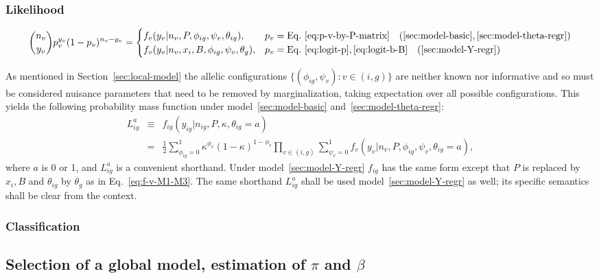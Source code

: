 \documentclass[letterpaper]{article}
\begin{document}
\subsubsection{Likelihood}

\begin{equation}
\label{eq:f-v-M1-M3}
\binom{n_v}{y_v} p_v^{y_v} (1-p_v)^{n_v-y_v}
=
\begin{cases}
f_v(y_v | n_v, P, \phi_{ig}, \psi_v, \theta_{ig}), & p_v =
\mathrm{Eq.~}\ref{eq:p-v-by-P-matrix}
\quad (\ref{sec:model-basic}, \ref{sec:model-theta-regr}) \\
f_v(y_v | n_v, x_i, B, \phi_{ig}, \psi_v, \theta_{g}), & p_v =
\mathrm{Eq.~}\ref{eq:logit-p},\ref{eq:logit-b-B}
\quad (\ref{sec:model-Y-regr})
\end{cases}
\end{equation}

As mentioned in Section~\ref{sec:local-model} the allelic configurations
\( \{ (\phi_{ig},\psi_v) : v\in(i,g) \} \) are
neither known nor informative and so must be considered nuisance parameters that
need to be removed by marginalization, taking expectation over all
possible configurations.  This yields the following probability mass
function under model~\ref{sec:model-basic} and~\ref{sec:model-theta-regr}:
\begin{eqnarray}
\label{eq:f-ig}
L_{ig}^a &\equiv&
f_{ig}(y_{ig} | n_{ig}, P, \kappa, \theta_{ig}=a)
\\
&=&
\frac{1}{2}
\sum_{\phi_{ig}=0}^1 \kappa^{\phi_v} (1 - \kappa)^{1-\phi_v}
\prod_{v\in(i,g)}
\sum_{\psi_v=0}^1
f_v(y_v | n_v, P, \phi_{ig}, \psi_v, \theta_{ig}=a),
\end{eqnarray}
where \(a\) is 0 or 1, and \(L_{ig}^a\) is a convenient shorthand.  Under
model~\ref{sec:model-Y-regr} \(f_{ig}\) has the same form except that \(P\) is
replaced by \(x_i,B\) and \(\theta_{ig}\) by \(\theta_g\) as in
Eq.~\ref{eq:f-v-M1-M3}.  The same shorthand \(L_{ig}^a\) shall
be used model~\ref{sec:model-Y-regr} as well; its specific semantics shall be clear from
the context.

\subsubsection{Classification}

\subsection{Selection of a global model, estimation of \(\pi\) and \(\beta\)}
\label{sec:marginal-likelihood-pi}
\end{document}
